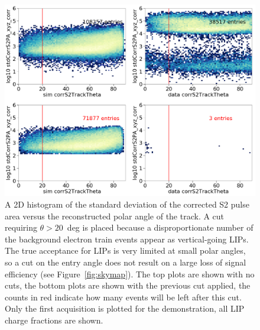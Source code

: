 \begin{figure}[htbp]
\begin{center}
\includegraphics[width=\textwidth]{figures/lips/cut5.png}
\caption{ A 2D histogram of the standard deviation of the corrected S2 pulse area versus the reconstructed polar angle of the track. A cut requiring $\theta > 20$~deg is placed because a disproportionate number of the background electron train events appear as vertical-going \acs{LIP}s. The true acceptance for \acs{LIP}s is very limited at small polar angles, so a cut on the entry angle does not result on a large loss of signal efficiency (see Figure~\ref{fig:skymap}). The top plots are shown with no cuts, the bottom plots are shown with the previous cut applied, the counts in red indicate how many events will be left after this cut. Only the first acquisition is plotted for the demonstration, all \acs{LIP} charge fractions are shown.  }
\label{fig:cut5}
\end{center}
\end{figure}

